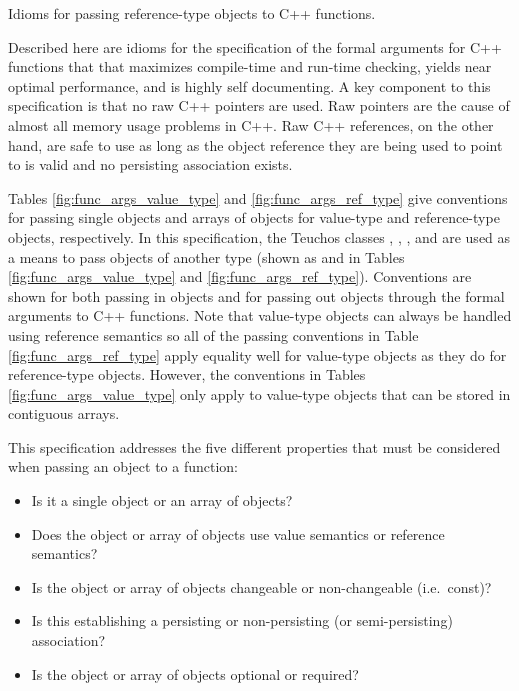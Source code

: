 \documentclass[pdf,ps2pdf,11pt]{SANDreport}
\begin{document}
\begin{table}[p]
%
\begin{center}

\end{center}
\caption{\label{fig:func_args_ref_type}
Idioms for passing reference-type objects to C++ functions.}
\end{table}


Described here are idioms for the specification of the formal
arguments for C++ functions that that maximizes compile-time and
run-time checking, yields near optimal performance, and is highly self
documenting.  A key component to this specification is that no raw C++
pointers are used.  Raw pointers are the cause of almost all memory
usage problems in C++.  Raw C++ references, on the other hand, are
safe to use as long as the object reference they are being used to
point to is valid and no persisting association exists.

Tables {}\ref{fig:func_args_value_type} and
{}\ref{fig:func_args_ref_type} give conventions for passing single
objects and arrays of objects for value-type {} and reference-type {} objects,
respectively.  In this specification, the Teuchos classes {},
{}, {}, and {} are used as a
means to pass objects of another type (shown as {} and
{} in Tables {}\ref{fig:func_args_value_type} and
{}\ref{fig:func_args_ref_type}).  Conventions are shown for both
passing in objects and for passing out objects through the formal
arguments to C++ functions.  Note that value-type objects can always
be handled using reference semantics so all of the passing conventions
in Table {}\ref{fig:func_args_ref_type} apply equality well for
value-type objects as they do for reference-type objects.  However,
the conventions in Tables {}\ref{fig:func_args_value_type} only apply
to value-type objects that can be stored in contiguous arrays.

This specification addresses the five different properties that must
be considered when passing an object to a function:

\begin{itemize}

{}\item Is it a single object or an array of objects?

{}\item Does the object or array of objects use value semantics or
reference semantics?

{}\item Is the object or array of objects changeable or non-changeable
(i.e.\ const)?

{}\item Is this establishing a persisting or non-persisting (or
semi-persisting) association?

{}\item Is the object or array of objects optional or required?

\end{itemize}
\end{document}
